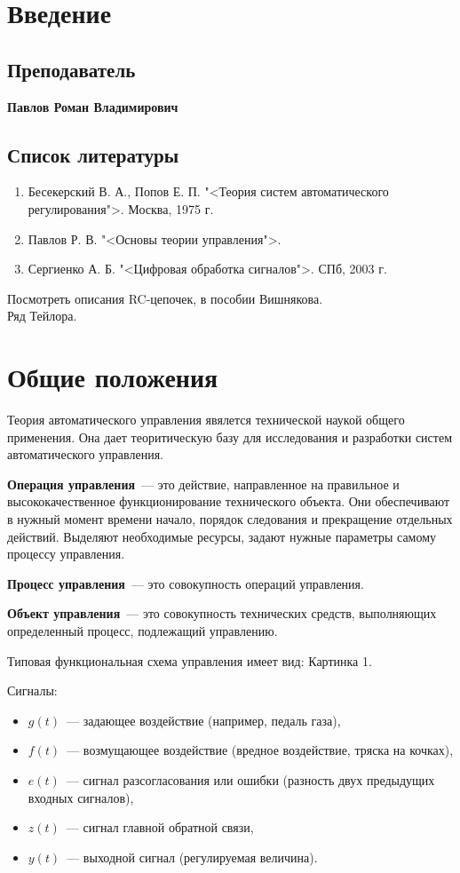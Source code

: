 \section{Введение}
\subsection{Преподаватель}
\textbf{Павлов Роман Владимирович}

\subsection{Список литературы}
\begin{enumerate}
	\item Бесекерский В. А., Попов Е. П. "<Теория систем автоматического регулирования">. Москва, 1975 г.
	\item Павлов Р. В. "<Основы теории управления">.
	\item Сергиенко А. Б. "<Цифровая обработка сигналов">. СПб, 2003 г.
\end{enumerate}

Посмотреть описания RC-цепочек, в пособии Вишнякова.\\
Ряд Тейлора.

\section{Общие положения}
Теория автоматического управления явялется технической наукой общего применения. Она дает теоритическую базу для исследования и разработки систем автоматического управления.

\textbf{Операция управления}~--- это действие, направленное на правильное и высококачественное функционирование технического объекта. Они обеспечивают в нужный момент времени начало, порядок следования и прекращение отдельных действий. Выделяют необходимые ресурсы, задают нужные параметры самому процессу управления.

\textbf{Процесс управления}~--- это совокупность операций управления.

\textbf{Объект управления}~--- это совокупность технических средств, выполняющих определенный процесс, подлежащий управлению.

Типовая функциональная схема управления имеет вид:
Картинка 1.

Сигналы:
\begin{itemize}
	\item $g(t)$~--- задающее воздействие (например, педаль газа),
	\item $f(t)$~--- возмущающее воздействие (вредное воздействие, тряска на кочках),
	\item $e(t)$~--- сигнал разсогласования или ошибки (разность двух предыдущих входных сигналов),
	\item $z(t)$~--- сигнал главной обратной связи,
	\item $y(t)$~--- выходной сигнал (регулируемая величина).
\end{itemize}

